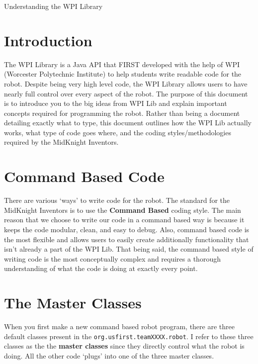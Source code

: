 \documentclass[11pt,fleqn]{article}
\begin{document}
\begin{center}
{\Huge
Understanding the WPI Library
}
\end{center}

\begin{mdframed}

\end{mdframed}

\section{Introduction}

The WPI Library is a Java API that FIRST developed with the help of WPI (Worcester Polytechnic Institute)
to help students write readable code for the robot. Despite being very high level code, the WPI Library
allows users to have nearly full control over every aspect of the robot. The purpose of this document
is to introduce you to the big ideas from WPI Lib and explain important concepts required for programming
the robot. Rather than being a document detailing exactly what to type, this document outlines how the
WPI Lib actually works, what type of code goes where, and the coding styles/methodologies required by
the MidKnight Inventors. 

\section{Command Based Code}

There are various `ways' to write code for the robot. The standard for the MidKnight Inventors is to use
the \textbf{Command Based} coding style. The main reason that we choose to write our code in a command
based way is because it keeps the code modular, clean, and easy to debug. Also, command based code is
the most flexible and allows users to easily create additionally functionality that isn't already a part
of the WPI Lib. That being said, the command based style of writing code is the most conceptually complex
and requires a thorough understanding of what the code is doing at exactly every point. 

\section{The Master Classes}

When you first make a new command based robot program, there are three default classes present in the
\texttt{org.usfirst.teamXXXX.robot}. I refer to these three classes as the the \textbf{master classes}
since they directly control what the robot is doing. All the other code `plugs' into one of the three
master classes. 
\end{document}
